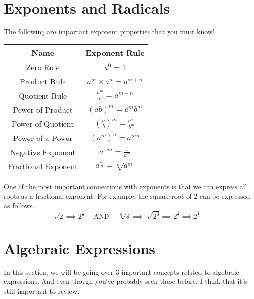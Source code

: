 \section{Exponents and Radicals}
The following are important exponent properties that you must know!\\
\begin{center}
\begin{tabular}{c|c}
    Name & Exponent Rule \\
    \hline
    Zero Rule & $a^0 = 1$ \\
    Product Rule & $a^m \times a^n = a^{m+n}$ \\
    Quotient Rule & $\frac{a^m}{a^n} = a^{m-n}$ \\
    Power of Product & $(ab)^m = a^mb^m$\\
    Power of Quotient & $\left(\frac{a}{b}\right)^m = \frac{a^m}{b^m}$  \\
    Power of a Power & $(a^m)^n = a^{mn}$ \\
    Negative Exponent & $a^{-m} = \frac{1}{a^m}$ \\
    Fractional Exponent & $a^{\frac{m}{n}} = \sqrt[n]{a^m}$
\end{tabular}
\end{center}
One of the most important connections with exponents is that we can express all roots as a fractional exponent. For example, the square root of $2$ can be expressed as follows.
$$
\sqrt{2} \implies 2^\frac{1}{2} \quad \text{ AND } \quad \sqrt[6]{8} \implies \sqrt[6]{2^3} \implies 2^\frac{3}{6} \implies 2^\frac{1}{2}
$$
\section{Algebraic Expressions}
In this section, we will be going over $3$ important concepts related to algebraic expressions. And even though you've probably seen these before, I think that it's still important to review.
